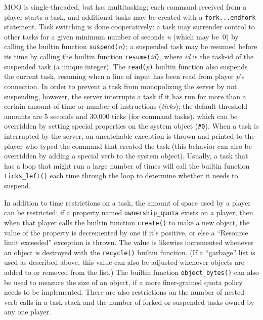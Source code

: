 \documentclass{article}
\begin{document}
MOO is single-threaded, but has multitasking; each command received
from a player starts a task, and additional tasks may be created with a
\texttt{fork...endfork} statement.  Task switching is done
cooperatively: a task may surrender control to other tasks for a given
minimum number of seconds \textit{n} (which may be~0) by calling the
builtin function \texttt{suspend(}\textit{n}\texttt{)}; a suspended task may be
resumed before its time by calling the builtin function
\texttt{resume(}\textit{id}\texttt{)}, where \textit{id} is the task-id of the
suspended task (a unique integer).  The
\texttt{read(}\textit{p}\texttt{)} builtin function also
suspends the current task, resuming when a line of input has been read
from player \textit{p}'s connection.  In order to prevent a task from
monopolizing the server by not suspending, however, the server
interrupts a task if it has run for more than a certain amount of time
or number of instructions (\emph{ticks}); the default threshold
amounts are 5 seconds and 30,000 ticks (for command tasks), which can
be overridden by setting special properties on the system object
(\texttt{\#0}).  When a task is interrupted by the server, an
uncatchable exception is thrown and printed to the player who typed
the command that created the task (this behavior can also be
overridden by adding a special verb to the system object).  Usually, a
task that has a loop that might run a large number of times will call
the builtin function
\texttt{ticks\_left()} each time through the loop to determine whether
it needs to suspend.

In addition to time restrictions on a task, the amount of space used
by a player can be restricted; if a property named
\texttt{ownership\_quota} exists on a player, then when that player
calls the builtin function \texttt{create()} to make a new object, the
value of the property is decremented by one if it's positive, or else
a ``Resource limit exceeded'' exception is thrown.  The value is
likewise incremented whenever an object is destroyed with the
\texttt{recycle()} builtin function.  (If a ``garbage'' list is used
as described above, this value can also be adjusted whenever objects
are added to or removed from the list.)  The builtin function
\texttt{object\_bytes()} can also be used to measure the size of an
object, if a more finer-grained quota policy needs to be implemented.
There are also restrictions on the number of nested verb calls in a
task stack and the number of forked or suspended tasks owned by any
one player.
\end{document}
